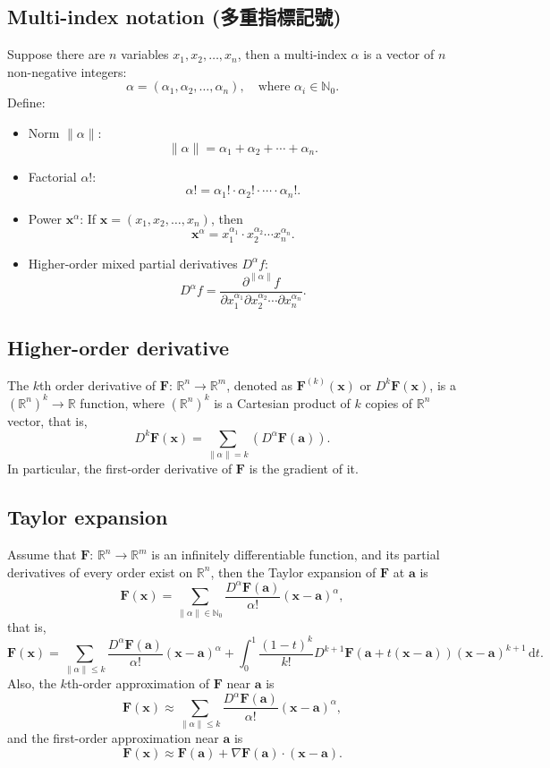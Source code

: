 \documentclass[a4paper,12pt]{report}
\begin{document}
\subsection{Multi-index notation (多重指標記號)}
Suppose there are \( n \) variables \( x_1, x_2, \dots, x_n \), then a multi-index $\alpha$ is a vector of \( n \) non-negative integers: 
\[
\alpha = (\alpha_1, \alpha_2, \dots, \alpha_n), \quad \text{where } \alpha_i \in \mathbb{N}_0.
\]
Define: 
\begin{itemize}
\item Norm \( \|\alpha\| \): 
\[
\|\alpha\| = \alpha_1 + \alpha_2 + \cdots + \alpha_n.
\]
\item Factorial \( \alpha! \): 
\[
\alpha! = \alpha_1! \cdot \alpha_2! \cdot \cdots \cdot \alpha_n!.
\]
\item Power \( \mathbf{x}^\alpha \): 
If \( \mathbf{x} = (x_1, x_2, \dots, x_n) \), then
\[
\mathbf{x}^\alpha = x_1^{\alpha_1} \cdot x_2^{\alpha_2} \cdots x_n^{\alpha_n}.
\]
\item Higher-order mixed partial derivatives $D^\alpha f$: 
\[
D^\alpha f = \frac{\partial^{\|\alpha\|} f}{\partial x_1^{\alpha_1} \partial x_2^{\alpha_2} \cdots \partial x_n^{\alpha_n}}.
\]
\end{itemize}
\subsection{Higher-order derivative}
The $k$th order derivative of $\mathbf{F}:\,\mathbb{R}^n\to\mathbb{R}^m$, denoted as $\mathbf{F}^{(k)}(\mathbf{x})$ or $D^{k}\mathbf{F}(\mathbf{x})$, is a $(\mathbb{R}^n)^k\to\mathbb{R}$ function, where $(\mathbb{R}^n)^k$ is a Cartesian product of $k$ copies of $\mathbb{R}^n$ vector, that is,
\[D^{k}\mathbf{F}(\mathbf{x})=\sum_{\|\alpha\|=k} \left(D^\alpha \mathbf{F}(\mathbf{a})\right).\]
In particular, the first-order derivative of $\mathbf{F}$ is the gradient of it.
\subsection{Taylor expansion}
Assume that $\mathbf{F}:\,\mathbb{R}^n\to\mathbb{R}^m$ is an infinitely differentiable function, and its partial derivatives of every order exist on $\mathbb{R}^n$, then the Taylor expansion of $\mathbf{F}$ at $\mathbf{a}$ is
\[\mathbf{F}(\mathbf{x}) = \sum_{\|\alpha\|\in\mathbb{N}_0} \frac{D^\alpha \mathbf{F}(\mathbf{a})}{\alpha!} (\mathbf{x} - \mathbf{a})^\alpha,\]
that is,
\[\mathbf{F}(\mathbf{x}) = \sum_{\|\alpha\|\leq k} \frac{D^\alpha \mathbf{F}(\mathbf{a})}{\alpha!} (\mathbf{x} - \mathbf{a})^\alpha+\int_0^1\frac{(1-t)^k}{k!} D^{k+1}\mathbf{F}(\mathbf{a} + t(\mathbf{x} - \mathbf{a})) (\mathbf{x} - \mathbf{a})^{k+1} \, \mathrm{d}t.\]
Also, the $k$th-order approximation of $\mathbf{F}$ near $\mathbf{a}$ is
\[\mathbf{F}(\mathbf{x}) \approx \sum_{\|\alpha\|\leq k} \frac{D^\alpha \mathbf{F}(\mathbf{a})}{\alpha!} (\mathbf{x} - \mathbf{a})^\alpha,\]
and the first-order approximation near $\mathbf{a}$ is
\[\mathbf{F}(\mathbf{x}) \approx \mathbf{F}(\mathbf{a}) + \nabla \mathbf{F}(\mathbf{a}) \cdot (\mathbf{x} - \mathbf{a}).\]
\end{document}
